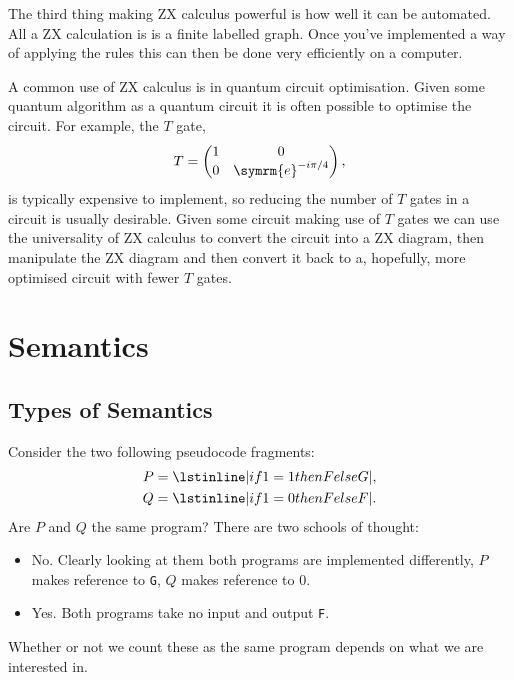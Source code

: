 \documentclass[fleqn]{NotesClass}
\newcommand{\e}{\symrm{e}}
\begin{document}
    The third thing making ZX calculus powerful is how well it can be automated.
    All a ZX calculation is is a finite labelled graph.
    Once you've implemented a way of applying the rules this can then be done very efficiently on a computer.
    
    A common use of ZX calculus is in quantum circuit optimisation.
    Given some quantum algorithm as a quantum circuit it is often possible to optimise the circuit.
    For example, the \(T\) gate,
    \begin{equation}
        T = 
        \begin{pmatrix}
            1 & 0\\
            0 & \e^{-i\pi/4}
        \end{pmatrix}
        ,
    \end{equation}
    is typically expensive to implement, so reducing the number of \(T\) gates in a circuit is usually desirable.
    Given some circuit making use of \(T\) gates we can use the universality of ZX calculus to convert the circuit into a ZX diagram, then manipulate the ZX diagram and then convert it back to a, hopefully, more optimised circuit with fewer \(T\) gates.
    
    \chapter{Semantics}
    \section{Types of Semantics}
    Consider the two following pseudocode fragments:
    \begin{align}
        P &= \lstinline|if 1 = 1 then F else G|,\\
        Q &= \lstinline|if 1 = 0 then F else F|.
    \end{align}
    Are \(P\) and \(Q\) the same program?
    There are two schools of thought:
    \begin{itemize}
        \item No. Clearly looking at them both programs are implemented differently, \(P\) makes reference to \lstinline|G|, \(Q\) makes reference to 0.
        \item Yes. Both programs take no input and output \lstinline|F|.
    \end{itemize}
    Whether or not we count these as the same program depends on what we are interested in.
    
\end{document}
